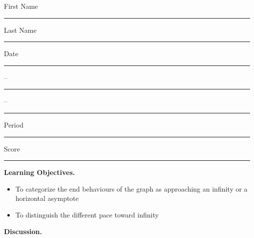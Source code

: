 \documentclass[twoside, 10pt]{article}
\title{}
\date{}
\begin{document}
\noindent
{\large
First Name \rule{6em}{.1pt}Last Name \rule{6em}{.1pt} Date \rule{1.5em}{.1pt} -- \rule{1.5em}{.1pt} -- \rule{1.5em}{.1pt} Period \rule{2em}{.1pt} Score \rule{2em}{.1pt}
}
\vspace{1em}

{\noindent \bf Learning Objectives.}
\begin{itemize}
\item
To categorize the end behaviours of the graph as approaching an infinity or a horizontal asymptote
\item
To distinguish the different pace toward infinity
\end{itemize}

{\noindent\bf Discussion.}
\end{document}

